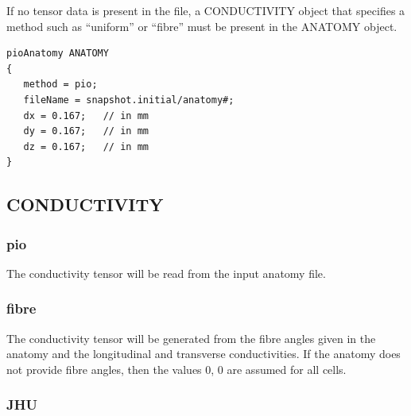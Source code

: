 \documentclass{article}
\begin{document}
If no tensor data is present in the file, a CONDUCTIVITY object that
specifies a method such as ``uniform'' or ``fibre'' must be present in
the ANATOMY object.



\begin{verbatim}
pioAnatomy ANATOMY 
{
   method = pio;
   fileName = snapshot.initial/anatomy#;
   dx = 0.167;   // in mm
   dy = 0.167;   // in mm
   dz = 0.167;   // in mm
}
\end{verbatim}

\subsection{CONDUCTIVITY}
\begin{keywords}
\end{keywords}

\subsubsection{pio}
The conductivity tensor will be read from the input anatomy file.

\subsubsection{fibre}
The conductivity tensor will be generated from the fibre angles
given in the anatomy and the longitudinal and transverse
conductivities.  If the anatomy does not provide fibre angles, then the
values 0, 0 are assumed for all cells.
\begin{keywords}
\end{keywords}
\subsubsection{JHU}
\begin{keywords}
\end{keywords}
\end{document}

